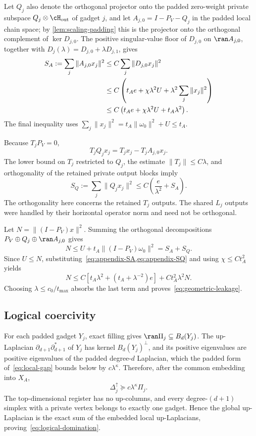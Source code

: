 Let \(Q_j\) also denote the orthogonal projector onto the padded zero-weight private subspace \(Q_j\otimes\cH_{\rm out}\) of gadget \(j\), and let \(A_{j,0}=I-P_V-Q_j\) in the padded local chain space; by \cref{lem:scaling-padding} this is the projector onto the orthogonal complement of \(\ker D_{j,0}\). The positive singular-value floor of \(D_{j,0}\) on \(\ran A_{j,0}\), together with
\(
D_j(\lambda)=D_{j,0}+\lambda D_{j,1}
\), gives
\begin{align}
S_A:=\sum_j\|A_{j,0}x_j\|^2
&\le C\sum_j\|D_{j,0}x_j\|^2\notag\\
&\le C\left(
t_Ae+\chi\lambda^2U+
\lambda^2\sum_j\|x_j\|^2
\right)\notag\\
&\le C\left(t_Ae+\chi\lambda^2U+t_A\lambda^2\right).
\label{eq:appendix-SA}
\end{align}
The final inequality uses
\(
\sum_j\|x_j\|^2
=t_A\|\omega_0\|^2+U\le t_A
\).

Because \(T_jP_V=0\),
\[
T_jQ_jx_j=T_jx_j-T_jA_{j,0}x_j.
\]
The lower bound on \(T_j\) restricted to \(Q_j\), the estimate \(\|T_j\|\le C\lambda\), and orthogonality of the retained private output blocks imply
\begin{equation}
\label{eq:appendix-SQ}
S_Q:=\sum_j\|Q_jx_j\|^2
\le C\left(\frac{e}{\lambda^2}+S_A\right).
\end{equation}
The orthogonality here concerns the retained \(T_j\) outputs. The shared \(L_j\) outputs were handled by their horizontal operator norm and need not be orthogonal.

Let \(N=\|(I-P_V)x\|^2\). Summing the orthogonal decompositions \(P_V\oplus Q_j\oplus\ran A_{j,0}\) gives
\[
N\le U+t_A\|(I-P_V)\omega_0\|^2=S_A+S_Q.
\]
Since \(U\le N\), substituting~\cref{eq:appendix-SA,eq:appendix-SQ} and using \(\chi\le Ct_A^2\) yields
\[
N\le C\left[t_A\lambda^2+(t_A+\lambda^{-2})e\right]
+Ct_A^2\lambda^2N.
\]
Choosing \(\lambda\le c_0/t_{\max}\) absorbs the last term and proves~\cref{eq:geometric-leakage}.

\subsection{Logical coercivity}

For each padded gadget \(Y_j\), exact filling gives \(\ran\Pi_j\subseteq B_d(Y_j)\). The up-Laplacian \(\partial_{d+1}\partial_{d+1}^*\) of \(Y_j\) has kernel \(B_d(Y_j)^\perp\), and its positive eigenvalues are positive eigenvalues of the padded degree-\(d\) Laplacian, which the padded form of~\cref{eq:local-gap} bounds below by \(c\lambda^\kappa\). Therefore, after the common embedding into \(X_A\),
\[
\Delta_j^\uparrow\succeq c\lambda^\kappa\Pi_j.
\]
The top-dimensional register has no up-columns, and every degree-\((d+1)\) simplex with a private vertex belongs to exactly one gadget. Hence the global up-Laplacian is the exact sum of the embedded local up-Laplacians, proving~\cref{eq:logical-domination}.

